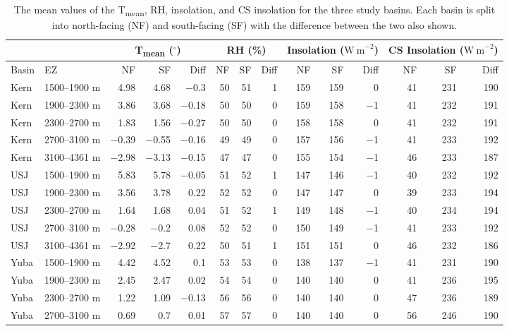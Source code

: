 \begin{table}[htbp]
\centering
\caption{The mean values of the T\textsubscript{mean}, RH, insolation, and CS insolation for the three study basins. Each basin is split into north-facing (NF) and south-facing (SF) with the difference between the two also shown.}
\label{tab:met_metric_table}
\tiny 
\begin{tabular}{llrrrrrrrrrrrr}
\toprule
& & \multicolumn{3}{c}{T\textsubscript{mean} ($^{\circ}$)} & \multicolumn{3}{c}{RH (\%)} & \multicolumn{3}{c}{Insolation ($\mathrm{W~m}^{-2}$)} & \multicolumn{3}{c}{CS Insolation ($\mathrm{W~m}^{-2}$)} \\
\midrule
Basin & EZ & NF & SF & Diff & NF & SF & Diff & NF & SF & Diff & NF & SF & Diff \\
\midrule
    Kern & 1500--1900 m & 4.98 & 4.68 & $-$0.3 & 50 & 51 & 1 & 159 & 159 & 0 & 41 & 231 & 190 \\
    Kern & 1900--2300 m & 3.86 & 3.68 & $-$0.18 & 50 & 50 & 0 & 159 & 158 & $-$1 & 41 & 232 & 191 \\
    Kern & 2300--2700 m & 1.83 & 1.56 & $-$0.27 & 50 & 50 & 0 & 158 & 158 & 0 & 41 & 232 & 191 \\
    Kern & 2700--3100 m & $-$0.39 & $-$0.55 & $-$0.16 & 49 & 49 & 0 & 157 & 156 & $-$1 & 41 & 233 & 192 \\
    Kern & 3100--4361 m & $-$2.98 & $-$3.13 & $-$0.15 & 47 & 47 & 0 & 155 & 154 & $-$1 & 46 & 233 & 187 \\
    USJ & 1500--1900 m & 5.83 & 5.78 & $-$0.05 & 51 & 52 & 1 & 147 & 146 & $-$1 & 40 & 232 & 192 \\
    USJ & 1900--2300 m & 3.56 & 3.78 & 0.22 & 52 & 52 & 0 & 147 & 147 & 0 & 39 & 233 & 194 \\
    USJ & 2300--2700 m & 1.64 & 1.68 & 0.04 & 51 & 52 & 1 & 149 & 148 & $-$1 & 40 & 234 & 194 \\
    USJ & 2700--3100 m & $-$0.28 & $-$0.2 & 0.08 & 52 & 52 & 0 & 150 & 149 & $-$1 & 41 & 233 & 192 \\
    USJ & 3100--4361 m & $-$2.92 & $-$2.7 & 0.22 & 50 & 51 & 1 & 151 & 151 & 0 & 46 & 232 & 186 \\
    Yuba & 1500--1900 m & 4.42 & 4.52 & 0.1 & 53 & 53 & 0 & 138 & 137 & $-$1 & 41 & 231 & 190 \\
    Yuba & 1900--2300 m & 2.45 & 2.47 & 0.02 & 54 & 54 & 0 & 140 & 140 & 0 & 41 & 236 & 195 \\
    Yuba & 2300--2700 m & 1.22 & 1.09 & $-$0.13 & 56 & 56 & 0 & 140 & 140 & 0 & 47 & 236 & 189 \\
    Yuba & 2700--3100 m & 0.69 & 0.7 & 0.01 & 57 & 57 & 0 & 140 & 140 & 0 & 56 & 246 & 190 \\
\bottomrule
\end{tabular}
\end{table}




